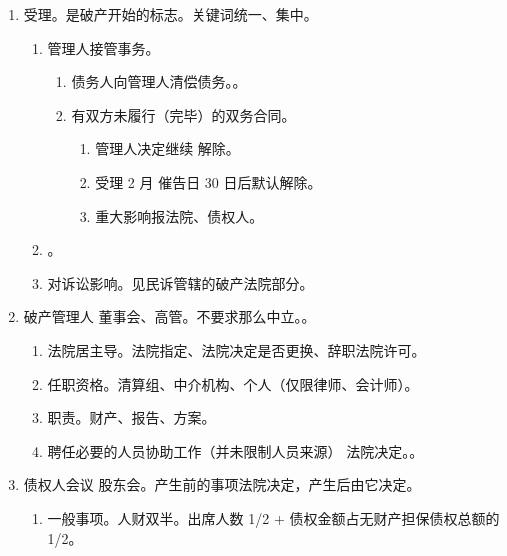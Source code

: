 \begin{enumerate}
\begin{enumerate}
          \item 受理。先受理后交费。很少考。
          \item 撤回、驳回。用的都是裁定。。
        \end{enumerate}
  \item 受理。是破产开始的标志。关键词统一、集中。
        \begin{enumerate}
          \item 管理人接管事务。
                \begin{enumerate}
                  \item 债务人向管理人清偿债务。。
                  \item 有双方未履行（完毕）的双务合同。
                        \begin{enumerate}
                          \item 管理人决定继续 \hz 解除。
                          \item 受理 2 月 \hz 催告日 30 日后默认解除。
                          \item 重大影响报法院、债权人。
                        \end{enumerate}
                \end{enumerate}
          \item {}。
          \item 对诉讼影响。见民诉管辖的破产法院部分。
        \end{enumerate}
  \item 破产管理人 \ydy 董事会、高管。不要求那么中立。。
        \begin{enumerate}
          \item 法院居主导。法院指定、法院决定是否更换、辞职法院许可。
          \item 任职资格。清算组、中介机构、个人（仅限律师、会计师）。
          \item 职责。财产、报告、方案。
          \item 聘任必要的人员协助工作（并未限制人员来源） \yjt 法院决定。。
        \end{enumerate}
  \item 债权人会议 \ydy 股东会。产生前的事项法院决定，产生后由它决定。
        \begin{enumerate}
          \item 一般事项。人财双半。出席人数 1/2 + 债权金额占无财产担保债权总额的 1/2。

\end{enumerate}
\end{enumerate}
